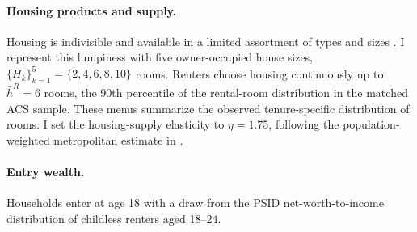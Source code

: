 \documentclass[11pt]{article}
\begin{document}
\paragraph{Housing products and supply.}
Housing is indivisible and available in a limited assortment of types and
sizes \citep{davisHousingFinanceMacroeconomy2015}. I represent this lumpiness
with five owner-occupied house sizes,
$\{H_k\}_{k=1}^5=\{2,4,6,8,10\}$ rooms. Renters choose housing continuously up
to $\bar h^R=6$ rooms, the 90th percentile of the rental-room distribution in
the matched ACS sample. These menus summarize the observed tenure-specific
distribution of rooms. I set the
housing-supply elasticity to $\eta=1.75$, following the population-weighted
metropolitan estimate in \citet{saizGeographicDeterminantsHousing2010}.

\paragraph{Entry wealth.}
Households enter at age 18 with a draw from the PSID net-worth-to-income
distribution of childless renters aged 18--24.
\end{document}
